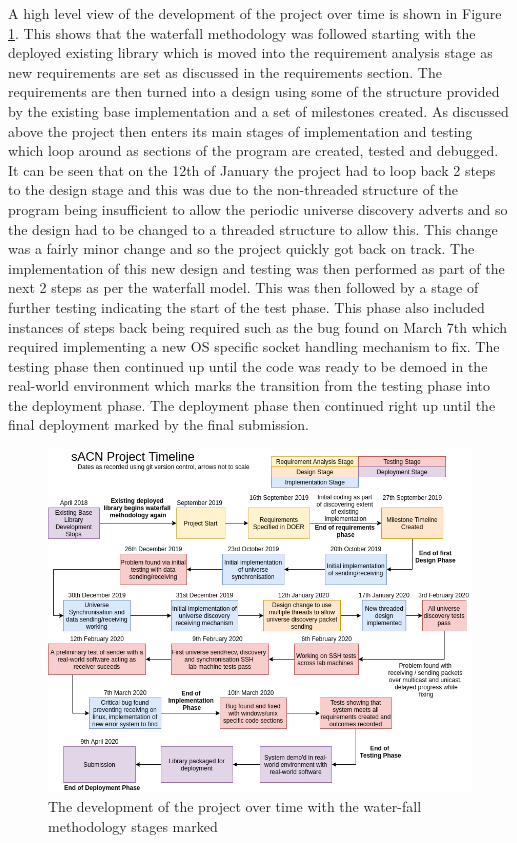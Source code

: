 \documentclass[11pt,a4paper]{article}
\begin{document}
A high level view of the development of the project over time is shown in Figure \ref{project_dev_timeline}. This shows that the waterfall methodology was followed starting with the deployed existing library which is moved into the requirement analysis stage as new requirements are set as discussed in the requirements section. The requirements are then turned into a design using some of the structure provided by the existing base implementation and a set of milestones created. As discussed above the project then enters its main stages of implementation and testing which loop around as sections of the program are created, tested and debugged. It can be seen that on the 12th of January the project had to loop back 2 steps to the design stage and this was due to the non-threaded structure of the program being insufficient to allow the periodic universe discovery adverts and so the design had to be changed to a threaded structure to allow this. This change was a fairly minor change and so the project quickly got back on track. The implementation of this new design and testing was then performed as part of the next 2 steps as per the waterfall model. This was then followed by a stage of further testing indicating the start of the test phase. This phase also included instances of steps back being required such as the bug found on March 7th which required implementing a new OS specific socket handling mechanism to fix. The testing phase then continued up until the code was ready to be demoed in the real-world environment which marks the transition from the testing phase into the deployment phase. The deployment phase then continued right up until the final deployment marked by the final submission.\\

\begin{figure}[H]
\label{project_dev_timeline}
\includegraphics[width=\textwidth]{CS4099-dev-timeline}
\caption{The development of the project over time with the water-fall methodology stages marked}
\end{figure}
\end{document}
